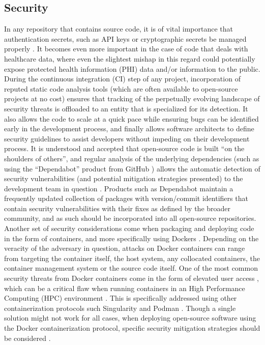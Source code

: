 \subsection{Security}
In any repository that contains source code, it is of vital importance that authentication secrets, such as API keys or cryptographic secrets be managed properly \cite{merkel_docker_nodate}. It becomes even more important in the case of code that deals with healthcare data, where even the slightest mishap in this regard could potentially expose protected health information (PHI) data and/or information to the public. During the continuous integration (CI) step of any project, incorporation of reputed static code analysis tools \cite{louridas_static_2006, ludwig_compiling_2017} (which are often available to open-source projects at no cost) ensures that tracking of the perpetually evolving landscape of security threats is offloaded to an entity that is specialized for its detection. It also allows the code to scale at a quick pace while ensuring bugs can be identified early in the development process, and finally allows software architects to define security guidelines to assist developers without impeding on their development process.
It is understood and accepted that open-source code is built “on the shoulders of others”, and regular analysis of the underlying dependencies (such as using the “Dependabot” product from GitHub \cite{noauthor_dependabot_nodate}) allows the automatic detection of security vulnerabilities (and potential mitigation strategies presented) to the development team in question \cite{alfadel_use_2021}. Products such as Dependabot maintain a frequently updated collection of packages with version/commit identifiers that contain security vulnerabilities with their fixes as defined by the broader community, and as such should be incorporated into all open-source repositories. Another set of security considerations come when packaging and deploying code in the form of containers, and more specifically using Dockers \cite{merkel_docker_nodate}. Depending on the veracity of the adversary in question, attacks on Docker containers can range from targeting the container itself, the host system, any collocated containers, the container management system or the source code itself\cite{combe_docker_2016}. One of the most common security threats from Docker containers come in the form of elevated user access \cite{combe_docker_2016, bui_analysis_2015}, which can be a critical flaw when running containers in an High Performance Computing (HPC) environment \cite{sparks_enabling_2019, bacis_dockerpolicymodules_2015}. This is specifically addressed using other containerization protocols such Singularity \cite{kurtzer_singularity_2017} and Podman \cite{gantikow_rootless_2020}. Though a single solution might not work for all cases, when deploying open-source software using the Docker containerization protocol, specific security mitigation strategies should be considered \cite{yasrab_mitigating_2021}.